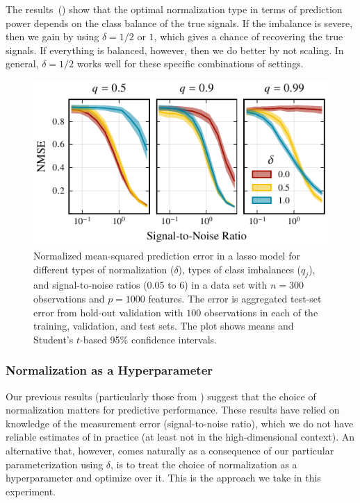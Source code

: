 The results~() show that the optimal normalization type in terms of
prediction power depends on the class balance of the true signals. If the imbalance is
severe, then we gain by using \(\delta=1/2\) or \(1\), which gives a chance of recovering
the true signals. If everything is balanced, however, then we do better by not scaling. In
general, \(\delta=1/2\) works well for these specific combinations of settings.

\begin{figure}[htpb]
  \centering
  \includegraphics[]{plots/binary_data_sim.pdf}
  \caption{%
    Normalized mean-squared prediction error in a lasso model for different types of
    normalization (\(\delta\)), types of class imbalances (\(q_j\)), and signal-to-noise ratios
    (0.05 to 6) in a data set with \(n=300\) observations and \(p = \num{1000}\) features. The
    error is aggregated test-set error from hold-out validation with \(100\) observations in
    each of the training, validation, and test sets. The plot shows means and Student's
    \(t\)-based 95\% confidence intervals. } \label{fig:binary-sim}
\end{figure}

\subsubsection{Normalization as a Hyperparameter}\label{sec:experiments-hyperparameter}

Our previous results (particularly those from ) suggest
that the choice of normalization matters for predictive performance. These results have
relied on knowledge of the measurement error (signal-to-noise ratio), which we do not have
reliable estimates of in practice (at least not in the high-dimensional context). An
alternative that, however, comes naturally as a consequence of our particular
parameterization using \(\delta\), is to treat the choice of normalization as a
hyperparameter and optimize over it. This is the approach we take in this experiment.

